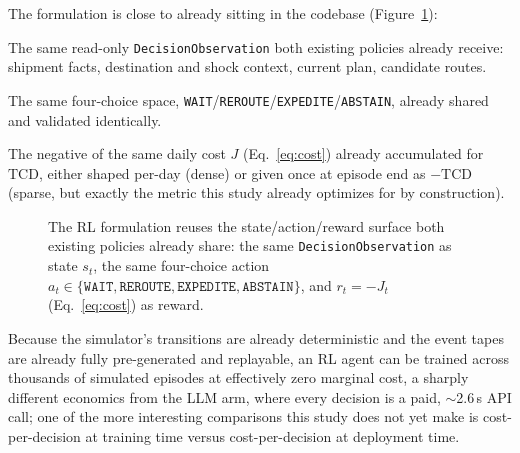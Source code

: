 \documentclass[10pt,twocolumn]{article}
\newcommand{\tcd}{\ensuremath{\mathrm{TCD}}}
\begin{document}
The formulation is close to already sitting in the codebase (Figure~\ref{fig:rlloop}):

\begin{description}[leftmargin=1.2em,style=unboxed]
\item[State.] The same read-only \texttt{DecisionObservation} both existing policies already receive: shipment facts, destination and shock context, current plan, candidate routes.
\item[Action.] The same four-choice space, \texttt{WAIT}/\texttt{REROUTE}/\texttt{EXPEDITE}/\texttt{ABSTAIN}, already shared and validated identically.
\item[Reward.] The negative of the same daily cost $J$ (Eq.~\ref{eq:cost}) already accumulated for $\tcd$, either shaped per-day (dense) or given once at episode end as $-\tcd$ (sparse, but exactly the metric this study already optimizes for by construction).
\end{description}

\begin{figure}[t]
\centering
{}
\caption{The RL formulation reuses the state/action/reward surface both existing policies already share: the same \texttt{DecisionObservation} as state $s_t$, the same four-choice action $a_t \in \{\texttt{WAIT},\texttt{REROUTE},\texttt{EXPEDITE},\texttt{ABSTAIN}\}$, and $r_t=-J_t$ (Eq.~\ref{eq:cost}) as reward.}
\label{fig:rlloop}
\end{figure}

Because the simulator's transitions are already deterministic and the event tapes are already fully pre-generated and replayable, an RL agent can be trained across thousands of simulated episodes at effectively zero marginal cost, a sharply different economics from the LLM arm, where every decision is a paid, $\sim$2.6\,s API call; one of the more interesting comparisons this study does not yet make is cost-per-decision at training time versus cost-per-decision at deployment time.
\end{document}
